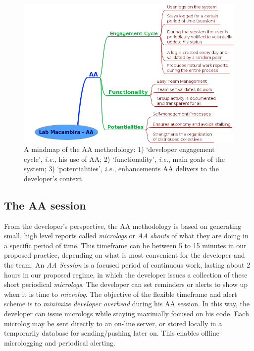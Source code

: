 \documentclass{article}
\newcommand{\ie}{{\it i.e.}}
\begin{document}
\begin{figure}
\begin{center}
   \includegraphics[width=0.8\linewidth,keepaspectratio=true]{figs/aa-mm2.png}
\end{center}
   \caption{
   A mindmap of the AA methodology: 1) `developer engagement cycle', \ie, his use
   of AA; 2) `functionality', \ie, main goals of the system; 3) `potentialities',
   \ie, enhancements AA delivers to the developer's context. 
   }
\label{fig:mm}
\end{figure}

\subsection{The AA session}

From the developer's perspective, the AA methodology is based on generating
small, high level reports called \emph{micrologs} or \emph{AA shouts} of what
they are doing in a specific period of time.  This timeframe can be
between 5 to 15 minutes in our proposed practice, depending on what is most
convenient for the developer and the team. An \emph{AA Session} is a focused
period of continuous work, lasting about 2 hours in our proposed regime, in
which the developer issues a collection of these short periodical
\emph{micrologs}. The developer can set reminders or alerts to show up when it
is time to \emph{microlog}. The objective of the flexible timeframe and alert
scheme is to \emph{minimize developer overhead} during his AA session.  In this
way, the developer can issue micrologs while staying maximally focused on
his code. Each microlog may be sent directly to an on-line server, or stored
locally in a temporarily database for sending/pushing later on.  This enables
offline micrologging and periodical alerting.
\end{document}
